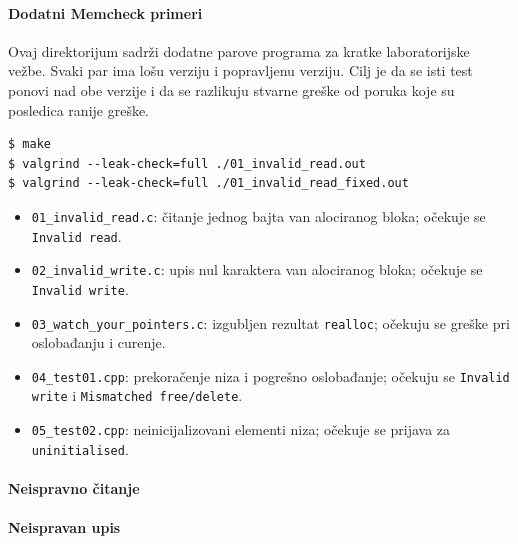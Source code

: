 \paragraph{Dodatni Memcheck primeri}\label{memcheck-dodatni-primeri}

Ovaj direktorijum sadrži dodatne parove programa za kratke laboratorijske vežbe. Svaki par ima lošu verziju i popravljenu verziju. Cilj je da se isti test ponovi nad obe verzije i da se razlikuju stvarne greške od poruka koje su posledica ranije greške.

\begin{verbatim}
$ make
$ valgrind --leak-check=full ./01_invalid_read.out
$ valgrind --leak-check=full ./01_invalid_read_fixed.out
\end{verbatim}

\begin{itemize}
\tightlist
\item
  \texttt{01\_invalid\_read.c}: čitanje jednog bajta van alociranog bloka; očekuje se \texttt{Invalid read}.
\item
  \texttt{02\_invalid\_write.c}: upis nul karaktera van alociranog bloka; očekuje se \texttt{Invalid write}.
\item
  \texttt{03\_watch\_your\_pointers.c}: izgubljen rezultat \texttt{realloc}; očekuju se greške pri oslobađanju i curenje.
\item
  \texttt{04\_test01.cpp}: prekoračenje niza i pogrešno oslobađanje; očekuju se \texttt{Invalid write} i \texttt{Mismatched free/delete}.
\item
  \texttt{05\_test02.cpp}: neinicijalizovani elementi niza; očekuje se prijava za \texttt{uninitialised}.
\end{itemize}

\paragraph{Neispravno čitanje}\label{memcheck-invalid-read-misc}



\paragraph{Neispravan upis}\label{memcheck-invalid-write-misc}



